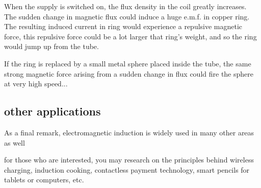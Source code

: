 When the supply is switched on, the flux density in the coil greatly increases. The sudden change in magnetic flux could induce a huge e.m.f. in copper ring. The resulting induced current in ring would experience a repulsive magnetic force, this repulsive force could be a lot larger that ring's weight, and so the ring would jump up from the tube.

If the ring is replaced by a small metal sphere placed inside the tube, the same strong magnetic force arising from a sudden change in flux could fire the sphere at very high speed...


\subsection*{other applications}

As a final remark, electromagnetic induction is widely used in many other areas as well

for those who are interested, you may research on the principles behind wireless charging, induction cooking, contactless payment technology, smart pencils for tablets or computers, etc.

